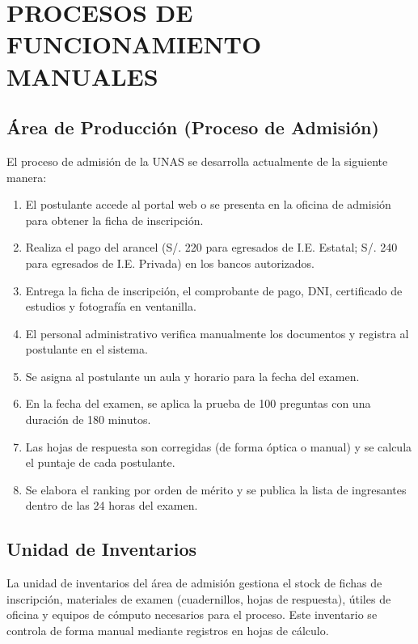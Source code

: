 \documentclass[12pt, a4paper]{report}
\begin{document}
\section{PROCESOS DE FUNCIONAMIENTO MANUALES}

\subsection*{Área de Producción (Proceso de Admisión)}

El proceso de admisión de la UNAS se desarrolla actualmente de la siguiente manera:

\begin{enumerate}[noitemsep]
  \item El postulante accede al portal web o se presenta en la oficina de admisión para obtener la ficha de inscripción.
  \item Realiza el pago del arancel (S/. 220 para egresados de I.E. Estatal; S/. 240 para egresados de I.E. Privada) en los bancos autorizados.
  \item Entrega la ficha de inscripción, el comprobante de pago, DNI, certificado de estudios y fotografía en ventanilla.
  \item El personal administrativo verifica manualmente los documentos y registra al postulante en el sistema.
  \item Se asigna al postulante un aula y horario para la fecha del examen.
  \item En la fecha del examen, se aplica la prueba de 100 preguntas con una duración de 180 minutos.
  \item Las hojas de respuesta son corregidas (de forma óptica o manual) y se calcula el puntaje de cada postulante.
  \item Se elabora el ranking por orden de mérito y se publica la lista de ingresantes dentro de las 24 horas del examen.
\end{enumerate}

\subsection*{Unidad de Inventarios}

La unidad de inventarios del área de admisión gestiona el stock de fichas de inscripción, materiales de examen (cuadernillos, hojas de respuesta), útiles de oficina y equipos de cómputo necesarios para el proceso. Este inventario se controla de forma manual mediante registros en hojas de cálculo.
\end{document}
